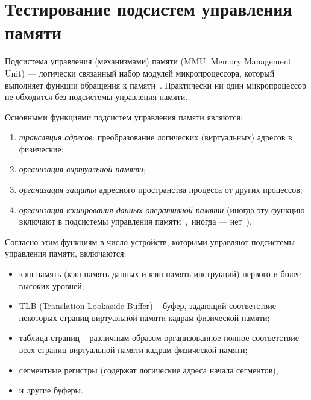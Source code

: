 %
%
%


\section{Тестирование подсистем управления памяти}\label{section:cache}

Подсистема управления (механизмами) памяти (MMU, Memory Management Unit) ---
логически связанный набор модулей микропроцессора, который выполняет
функции обращения к памяти~\cite{MMU}. Практически ни один
микропроцессор не обходится без подсистемы управления памяти.

Основными функциями подсистем управления памяти являются:
\begin{enumerate}
  \item \emph{трансляция адресов}: преобразование логических (виртуальных) адресов в физические;
  \item \emph{организация виртуальной памяти};
  \item \emph{организация защиты} адресного пространства процесса от других процессов;
  \item \emph{организация кэширования данных оперативной памяти} (иногда эту функцию включают в подсистемы управления памяти~\cite{vorobyev},~иногда --- нет~\cite{thompson}).
\end{enumerate}

Согласно этим функциям в число устройств, которыми управляют подсистемы управления памяти, включаются:
\begin{itemize}
  \item кэш-память (кэш-память данных и кэш-память инструкций)  первого и более высоких уровней;
  \item TLB (Translation Lookaside Buffer) -- буфер, задающий соответствие некоторых страниц виртуальной памяти кадрам физической памяти;
  \item таблица страниц -- различным образом организованное полное соответствие всех страниц виртуальной памяти кадрам физической памяти;
  \item сегментные регистры (содержат логические адреса начала сегментов);
  \item и другие буферы.
\end{itemize}

